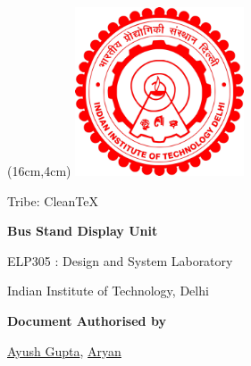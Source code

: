 
\begin{titlepage}
    

       \begin{textblock*}{2mm}(16cm,4cm)
       \includegraphics[width=50mm]{chapters/iitdlogo.png}
       \end{textblock*}
            \vskip2in
	        \raggedright
            \vskip3.5in
              {%
				\fontsize{20}{28}
				\boldmath
				\sffamily
				 Tribe: CleanTeX
				\par
            }
             \vskip0.25in
           
             {
				\Large
				\fontsize{28}{32}
				\bfseries
				\boldmath
				\sffamily
                Bus Stand Display Unit
				\par
            }
            \vskip0.15in
             {
				\fontsize{18}{18}
				\sffamily
                
				\par
            }
            \vskip0.15in
             {
				\fontsize{16}{16}
				\sffamily
                ELP305 : Design and System Laboratory
				\par
            }
            \vskip0.15in
             {
				\fontsize{16}{14}
				\sffamily
                Indian Institute of Technology, Delhi	
                \par
            }
    \vspace{1.in}
    {
        \normalsize
        \sffamily
        \textbf{Document Authorised by}\par \vspace{0.125cm}
        {\href{https://www.linkedin.com/in/ayush-gupta-undergraduate/}{Ayush Gupta}, \href{www.linkedin.com}{Aryan}}

}
\end{titlepage}
